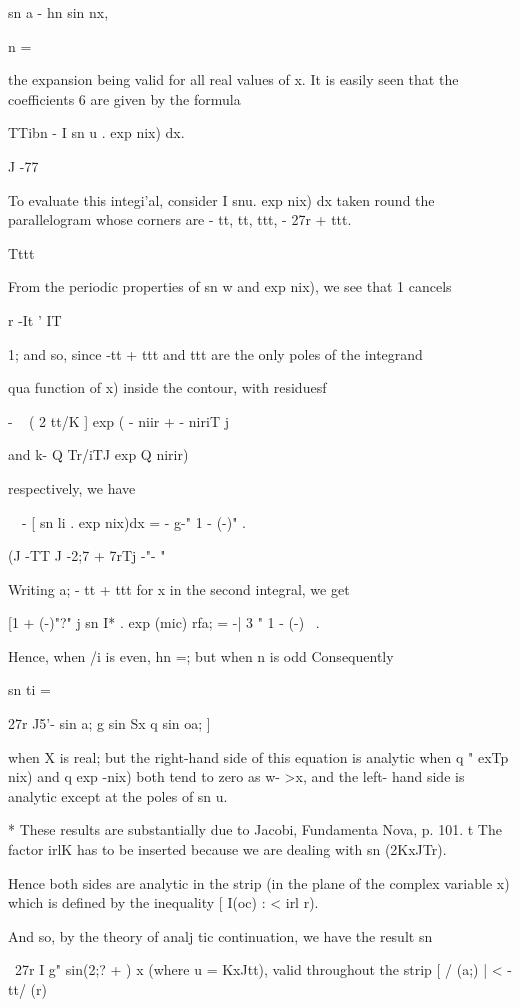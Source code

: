 sn a - hn sin nx,

n = \

the expansion being valid for all real values of x. It is easily seen
that the coefficients 6 are given by the formula

TTibn - I sn u . exp nix) dx.

J -77

To evaluate this integi'al, consider I snu. exp nix) dx taken round
the parallelogram whose corners are - tt, tt, ttt, - 27r + ttt.

Tttt

From the periodic properties of sn w and exp nix), we see that 1
cancels

r -It ' IT

1; and so, since -tt + ttt and ttt are the only poles of the
integrand

 qua function of x) inside the contour, with residuesf

- ~ ( 2 tt/K ] exp ( - niir + - niriT j

and k- Q Tr/iTJ exp Q nirir)

respectively, we have

\ \ - [ sn li . exp nix)dx = - g-" 1 - (-)" .

(J -TT J -2;7 + 7rTj -"- "

Writing a; - tt + ttt for x in the second integral, we get

[1 + (-)"?" j sn I* . exp (mic) rfa; = -| 3 " 1 - (-)~ .

Hence, when /i is even, hn =; but when n is odd Consequently

sn ti =

27r J5'- sin a; g sin Sx q sin oa; ]

when X is real; but the right-hand side of this equation is analytic
when q " exTp nix) and q exp -nix) both tend to zero as w- >x, and the
left- hand side is analytic except at the poles of sn u.

* These results are substantially due to Jacobi, Fundamenta Nova, p.
101. t The factor irlK has to be inserted because we are dealing with
sn (2KxJTr).

%
%

Hence both sides are analytic in the strip (in the plane of the
complex variable x) which is defined by the inequality [ I(oc) : < irl
r).

And so, by the theory of analj tic continuation, we have the result sn

\ 27r I g" sin(2;? + ) x (where u = KxJtt), valid throughout the strip
[ / (a;) | < - tt/ (r)

